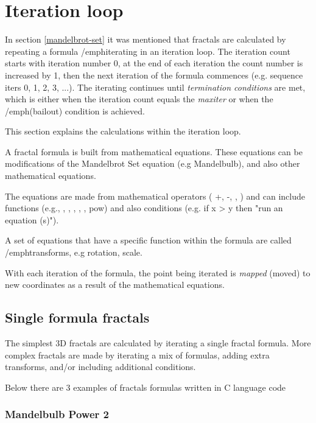 \section{Iteration loop}\label{iteration-loop}

In section \ref{mandelbrot-set} it was mentioned that fractals are calculated
by repeating a formula /emph{iterating} in an iteration loop. The iteration count starts with iteration number 0, at the end of each iteration the count number is increased by 1, then the next iteration of the formula commences (e.g. sequence iters 0, 1, 2, 3, ...). The iterating continues until \emph{termination conditions} are met, which is either when the iteration count equals the \emph{maxiter} or when the /emph({bailout}) condition is achieved.

This section explains the calculations within the iteration loop.

A fractal formula is built from mathematical equations. These equations can be modifications of the Mandelbrot Set equation (e.g Mandelbulb), and also other mathematical equations.

The equations are made from mathematical operators ( +, -, \times, \div)  and can include functions (e.g.\sin, \cos, \tan, \exp, \log, \sqrt{}, pow) and also conditions (e.g. if x > y then "run an equation (s)").

A set of equations that have a specific function within the formula are called /emph{transforms}, e.g rotation, scale.

With each iteration of the formula, the point being iterated is \emph{mapped} (moved) to new coordinates as a result of the mathematical equations.  

\subsection{Single formula fractals}\label{single-formula-fractals}

The simplest 3D fractals are calculated by iterating a single fractal formula. More complex fractals are made by iterating a mix of formulas, adding extra transforms, and/or including additional conditions. 

Below there are 3 examples of fractals formulas written in C language code

\subsubsection{Mandelbulb Power 2} \nopagebreak

